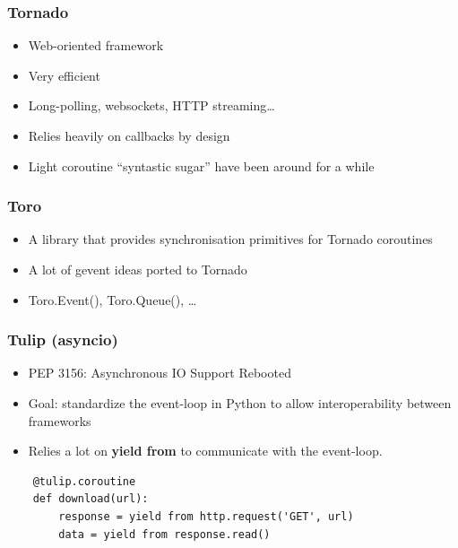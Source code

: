 \documentclass[ignorenonframetext,]{beamer}
\begin{document}
\begin{frame}[fragile]\frametitle{Tornado}

\begin{itemize}
\itemsep1pt\parskip0pt
\item
  Web-oriented framework
\item
  Very efficient
\item
  Long-polling, websockets, HTTP streaming\ldots{}
\item
  Relies heavily on callbacks by design
\item
  Light coroutine ``syntastic sugar'' have been around for a while
\end{itemize}

\end{frame}

\begin{frame}[fragile]\frametitle{Toro}

\begin{itemize}
\itemsep1pt\parskip0pt
\item
  A library that provides synchronisation primitives for Tornado
  coroutines
\item
  A lot of gevent ideas ported to Tornado
\item
  Toro.Event(), Toro.Queue(), \ldots{}
\end{itemize}

\end{frame}

\begin{frame}[fragile]\frametitle{Tulip (asyncio)}

\begin{itemize}
\itemsep1pt\parskip0pt
\item
  PEP 3156: Asynchronous IO Support Rebooted
\item
  Goal: standardize the event-loop in Python to allow interoperability
  between frameworks
\item
  Relies a lot on \textbf{yield from} to communicate with the
  event-loop.
\end{itemize}

\begin{verbatim}
    @tulip.coroutine
    def download(url):
        response = yield from http.request('GET', url)
        data = yield from response.read()
\end{verbatim}

\end{frame}
\end{document}
